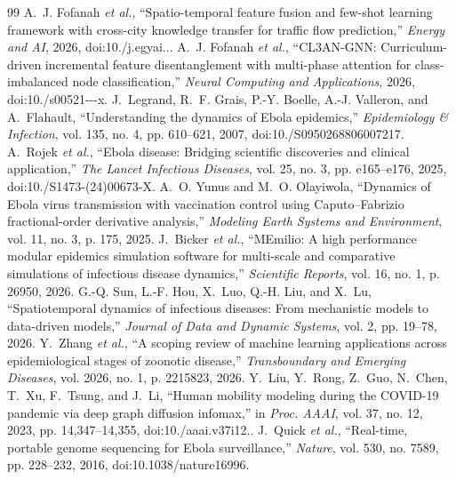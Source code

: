 \begin{thebibliography}{99}
 A.~J. Fofanah \emph{et al.}, ``Spatio-temporal feature fusion and few-shot learning framework with cross-city knowledge transfer for traffic flow prediction,'' \emph{Energy and AI}, 2026, doi:10./\allowbreak j.\allowbreak egyai...\allowbreak 
{} A.~J. Fofanah \emph{et al.}, ``CL3AN-GNN: Curriculum-driven incremental feature disentanglement with multi-phase attention for class-imbalanced node classification,'' \emph{Neural Computing and Applications}, 2026, doi:10./\allowbreak s00521---\allowbreak x.\allowbreak 
{} J.~Legrand, R.~F. Grais, P.-Y. Boelle, A.-J. Valleron, and A.~Flahault, ``Understanding the dynamics of Ebola epidemics,'' \emph{Epidemiology \& Infection}, vol. 135, no. 4, pp. 610--621, 2007, doi:10./\allowbreak S0950268806007217.\allowbreak 
{} A.~Rojek \emph{et al.}, ``Ebola disease: Bridging scientific discoveries and clinical application,'' \emph{The Lancet Infectious Diseases}, vol. 25, no. 3, pp. e165--e176, 2025, doi:10./\allowbreak S1473-(24)00673-\allowbreak X.\allowbreak 
{} A.~O. Yunus and M.~O. Olayiwola, ``Dynamics of Ebola virus transmission with vaccination control using Caputo--Fabrizio fractional-order derivative analysis,'' \emph{Modeling Earth Systems and Environment}, vol. 11, no. 3, p. 175, 2025.
 J.~Bicker \emph{et al.}, ``MEmilio: A high performance modular epidemics simulation software for multi-scale and comparative simulations of infectious disease dynamics,'' \emph{Scientific Reports}, vol. 16, no. 1, p. 26950, 2026.
 G.-Q. Sun, L.-F. Hou, X.~Luo, Q.-H. Liu, and X.~Lu, ``Spatiotemporal dynamics of infectious diseases: From mechanistic models to data-driven models,'' \emph{Journal of Data and Dynamic Systems}, vol. 2, pp. 19--78, 2026.
 Y.~Zhang \emph{et al.}, ``A scoping review of machine learning applications across epidemiological stages of zoonotic disease,'' \emph{Transboundary and Emerging Diseases}, vol. 2026, no. 1, p. 2215823, 2026.
 Y.~Liu, Y.~Rong, Z.~Guo, N.~Chen, T.~Xu, F.~Tsung, and J.~Li, ``Human mobility modeling during the COVID-19 pandemic via deep graph diffusion infomax,'' in \emph{Proc. AAAI}, vol. 37, no. 12, 2023, pp. 14{,}347--14{,}355, doi:10./\allowbreak aaai.\allowbreak v37i12..\allowbreak 
{} J.~Quick \emph{et al.}, ``Real-time, portable genome sequencing for Ebola surveillance,'' \emph{Nature}, vol. 530, no. 7589, pp. 228--232, 2016, doi:10.1038/nature16996.

\end{thebibliography}
